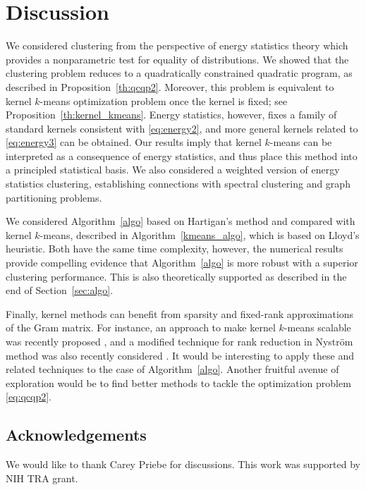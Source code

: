 \documentclass[aps,preprint,nofootinbib,floatfix]{revtex4-1}
\begin{document}
\section{Discussion}
\label{sec:conclusion}

We considered clustering from the perspective of energy
statistics theory which provides a nonparametric test for 
equality of distributions.
We showed that the clustering problem reduces to a quadratically
constrained quadratic program, 
as described in Proposition~\ref{th:qcqp2}.
Moreover, this problem is equivalent
to kernel $k$-means optimization problem once the kernel is fixed; see
Proposition~\ref{th:kernel_kmeans}. Energy statistics, however, fixes
a family of standard kernels consistent with \eqref{eq:energy2}, and
more general kernels related to \eqref{eq:energy3} can be obtained.
Our results imply that kernel $k$-means
can be interpreted as  a consequence of energy statistics, and thus place this 
method into a principled statistical basis.
We also considered a weighted version of energy statistics clustering,
establishing connections with spectral
clustering and graph partitioning problems.

We considered Algorithm~\ref{algo} based on Hartigan's method and
compared with 
kernel $k$-means, described in Algorithm~\ref{kmeans_algo}, which
is based on Lloyd's heuristic.
Both have the same time complexity, however, the numerical 
results provide compelling evidence that Algorithm~\ref{algo} 
is more robust with
a superior clustering performance. This is also theoretically
supported as described in the end of Section~\ref{sec:algo}.

Finally, kernel methods can benefit from sparsity and
fixed-rank approximations of the Gram matrix.
For instance, an approach to make kernel $k$-means scalable
was recently proposed \cite{Mahoney}, and a modified technique for
rank reduction in Nystr\"om method was also recently considered 
\cite{Becker}. It would be interesting to apply these and related
techniques to the case of Algorithm~\ref{algo}.
Another fruitful avenue of exploration would be to find 
better methods to tackle the optimization problem \eqref{eq:qcqp2}.


\subsection*{Acknowledgements}
We would like to thank Carey Priebe for discussions.
This work was supported by NIH TRA  grant.




\end{document}
